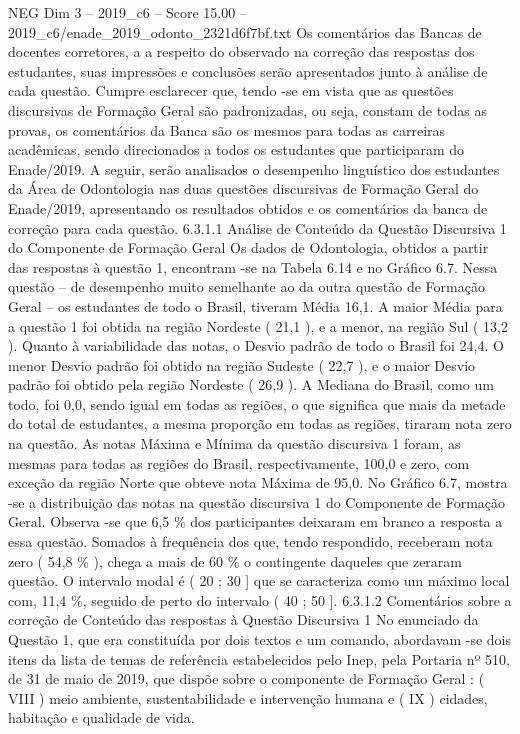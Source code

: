 \begin{textsample}{NEG Dim 3 – 2019\_c6 – Score 15.00 – 2019\_c6/enade\_2019\_odonto\_2321d6f7bf.txt}
Os comentários das Bancas de docentes corretores, a a respeito do observado na correção das respostas dos estudantes, suas impressões e conclusões serão apresentados junto à análise de cada questão.
Cumpre esclarecer que, tendo -se em vista que as questões discursivas de Formação Geral são padronizadas, ou seja, constam de todas as provas, os comentários da Banca são os mesmos para todas as carreiras acadêmicas, sendo direcionados a todos os estudantes que participaram do Enade/2019.
A seguir, serão analisados o desempenho linguístico dos estudantes da Área de Odontologia nas duas questões discursivas de Formação Geral do Enade/2019, apresentando os resultados obtidos e os comentários da banca de correção para cada questão. 6.3.1.1 Análise de Conteúdo da Questão Discursiva 1 do Componente de Formação Geral Os dados de Odontologia, obtidos a partir das respostas à questão 1, encontram -se na Tabela 6.14 e no Gráfico 6.7.
Nessa questão – de desempenho muito semelhante ao da outra questão de Formação Geral – os estudantes de todo o Brasil, tiveram Média 16,1.
A maior Média para a questão 1 foi obtida na região Nordeste ( 21,1 ), e a menor, na região Sul ( 13,2 ).
Quanto à variabilidade das notas, o Desvio padrão de todo o Brasil foi 24,4.
O menor Desvio padrão foi obtido na região Sudeste ( 22,7 ), e o maior Desvio padrão foi obtido pela região Nordeste ( 26,9 ).
A Mediana do Brasil, como um todo, foi 0,0, sendo igual em todas as regiões, o que significa que mais da metade do total de estudantes, a mesma proporção em todas as regiões, tiraram nota zero na questão.
As notas Máxima e Mínima da questão discursiva 1 foram, as mesmas para todas as regiões do Brasil, respectivamente, 100,0 e zero, com exceção da região Norte que obteve nota Máxima de 95,0.
No Gráfico 6.7, mostra -se a distribuição das notas na questão discursiva 1 do Componente de Formação Geral.
Observa -se que 6,5 \% dos participantes deixaram em branco a resposta a essa questão.
Somados à frequência dos que, tendo respondido, receberam nota zero ( 54,8 \% ), chega a mais de 60 \% o contingente daqueles que zeraram questão.
O intervalo modal é ( 20 ; 30 ] que se caracteriza como um máximo local com, 11,4 \%, seguido de perto do intervalo ( 40 ; 50 ]. 6.3.1.2 Comentários sobre a correção de Conteúdo das respostas à Questão Discursiva 1 No enunciado da Questão 1, que era constituída por dois textos e um comando, abordavam -se dois itens da lista de temas de referência estabelecidos pelo Inep, pela Portaria nº 510, de 31 de maio de 2019, que dispõe sobre o componente de Formação Geral : ( VIII ) meio ambiente, sustentabilidade e intervenção humana e ( IX ) cidades, habitação e qualidade de vida.

\end{textsample}
